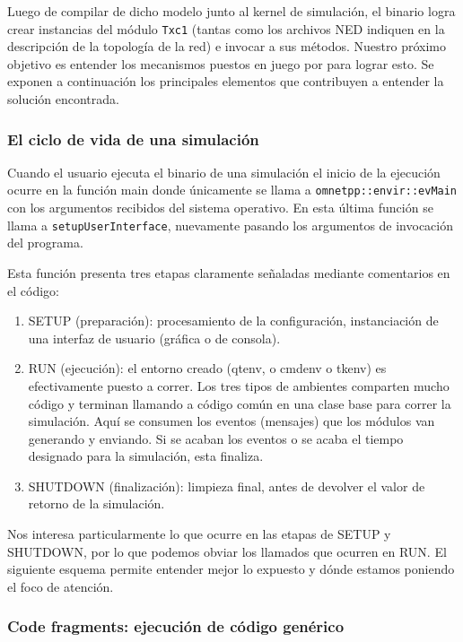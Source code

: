 \documentclass[]{article}
\begin{document}
Luego de compilar de dicho modelo junto al kernel de simulación, el binario
logra crear instancias del módulo \verb!Txc1! (tantas como los archivos NED
indiquen en la descripción de la topología de la red) e invocar a sus métodos.
Nuestro próximo objetivo es entender los mecanismos puestos en juego por
\omnetpp{} para lograr esto. Se exponen a continuación los principales elementos
que contribuyen a entender la solución encontrada.

\subsubsection{El ciclo de vida de una simulación}

Cuando el usuario ejecuta el binario de una simulación el inicio de la
ejecución ocurre en la función main donde únicamente se llama a
\verb!omnetpp::envir::evMain! con los argumentos recibidos del sistema
operativo. En esta última función se llama a \verb!setupUserInterface!,
nuevamente pasando los argumentos de invocación del programa.

Esta función presenta tres etapas claramente señaladas mediante comentarios en
el código:

\begin{enumerate}
    \item SETUP (preparación): procesamiento de la configuración, instanciación
de una interfaz de usuario (gráfica o de consola).

    \item RUN (ejecución): el entorno creado (qtenv, o cmdenv o tkenv) es
efectivamente puesto a correr. Los tres tipos de ambientes comparten mucho
código y terminan llamando a código común en una clase base para correr la
simulación. Aquí se consumen los eventos (mensajes) que los módulos van
generando y enviando. Si se acaban los eventos o se acaba el tiempo designado
para la simulación, esta finaliza.

    \item SHUTDOWN (finalización): limpieza final, antes de devolver el valor
de retorno de la simulación.
\end{enumerate}

Nos interesa particularmente lo que ocurre en las etapas de SETUP y SHUTDOWN,
por lo que podemos obviar los llamados que ocurren en RUN. El siguiente esquema
permite entender mejor lo expuesto y dónde estamos poniendo el foco de
atención.

\subsubsection{Code fragments: ejecución de código genérico}
\end{document}

